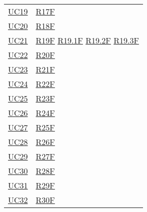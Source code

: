 \begin{center}
\begin{longtable}[!h]{m{50px} m{50px}}
        \hyperref[sec:UC19]{UC19}         & \hyperref[tab:RequisitiFunzionali]{R17F}    \\

        \hyperref[sec:UC20]{UC20}         & \hyperref[tab:RequisitiFunzionali]{R18F}    \\

        \hyperref[sec:UC21]{UC21}         & \hyperref[tab:RequisitiFunzionali]{R19F}
        \newline \hyperref[tab:RequisitiFunzionali]{R19.1F}
        \newline \hyperref[tab:RequisitiFunzionali]{R19.2F}
        \newline \hyperref[tab:RequisitiFunzionali]{R19.3F}                             \\

        \hyperref[sec:UC22]{UC22}         & \hyperref[tab:RequisitiFunzionali]{R20F}    \\

        \hyperref[sec:UC23]{UC23}         & \hyperref[tab:RequisitiFunzionali]{R21F}    \\

        \hyperref[sec:UC24]{UC24}         & \hyperref[tab:RequisitiFunzionali]{R22F}    \\

        \hyperref[sec:UC25]{UC25}         & \hyperref[tab:RequisitiFunzionali]{R23F}    \\

        \hyperref[sec:UC26]{UC26}         & \hyperref[tab:RequisitiFunzionali]{R24F}    \\

        \hyperref[sec:UC27]{UC27}         & \hyperref[tab:RequisitiFunzionali]{R25F}    \\

        \hyperref[sec:UC28]{UC28}         & \hyperref[tab:RequisitiFunzionali]{R26F}    \\

        \hyperref[sec:UC29]{UC29}         & \hyperref[tab:RequisitiFunzionali]{R27F}    \\

        \hyperref[sec:UC30]{UC30}         & \hyperref[tab:RequisitiFunzionali]{R28F}    \\

        \hyperref[sec:UC31]{UC31}         & \hyperref[tab:RequisitiFunzionali]{R29F}    \\

        \hyperref[sec:UC32]{UC32}         & \hyperref[tab:RequisitiFunzionali]{R30F}    \\


\end{longtable}
\end{center}
